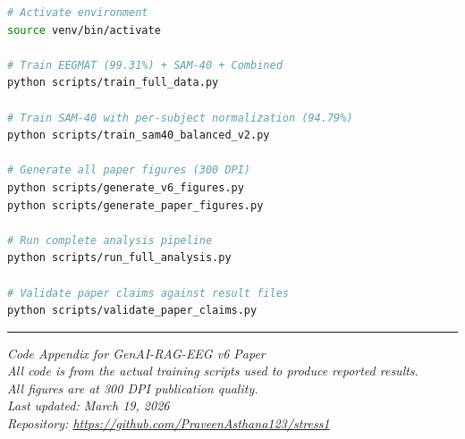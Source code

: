 \documentclass[11pt,a4paper]{article}
\begin{document}
\begin{lstlisting}[language=bash,caption={Commands to reproduce all results}]
# Activate environment
source venv/bin/activate

# Train EEGMAT (99.31%) + SAM-40 + Combined
python scripts/train_full_data.py

# Train SAM-40 with per-subject normalization (94.79%)
python scripts/train_sam40_balanced_v2.py

# Generate all paper figures (300 DPI)
python scripts/generate_v6_figures.py
python scripts/generate_paper_figures.py

# Run complete analysis pipeline
python scripts/run_full_analysis.py

# Validate paper claims against result files
python scripts/validate_paper_claims.py
\end{lstlisting}

\vspace{2em}
\noindent\rule{\textwidth}{0.5pt}
\begin{center}
\textit{Code Appendix for GenAI-RAG-EEG v6 Paper\\
All code is from the actual training scripts used to produce reported results.\\
All figures are at 300 DPI publication quality.\\
Last updated: March 19, 2026\\
Repository: \url{https://github.com/PraveenAsthana123/stress1}}
\end{center}
\end{document}
